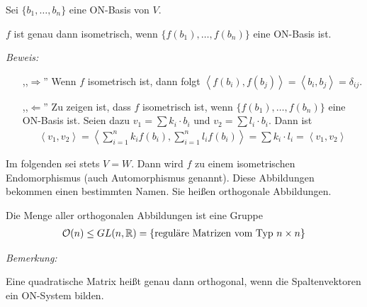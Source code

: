 
\begin{mylemma}
    Sei $\{ b_1, \ldots, b_n \}$ eine ON-Basis von $V$.

    $f$ ist genau dann isometrisch, wenn $\{ f(b_1), \ldots, f(b_n) \}$ eine ON-Basis ist.\medskip

    \textit{Beweis:}
    \begin{itemize}
        \item[,,$\Rightarrow$''] Wenn $f$ isometrisch ist, dann folgt $\left\langle f(b_i),f(b_j) \right\rangle = \left\langle b_i, b_j \right\rangle = \delta_{ij}$.
        \item[,,$\Leftarrow$''] Zu zeigen ist, dass $f$ isometrisch ist, wenn $\{ f(b_1), \ldots, f(b_n) \}$ eine ON-Basis ist.
            Seien dazu $v_1 = \sum k_i \cdot b_i$ und $v_2 = \sum l_i \cdot b_i$.
            Dann ist
            \begin{align*}
                \left\langle v_1, v_2 \right\rangle = \left\langle \sum\limits_{i = 1}^n k_i f(b_i), \sum\limits_{i = 1}^n l_i f(b_i) \right\rangle = \sum k_i \cdot l_i = \left\langle v_1, v_2 \right\rangle
            \end{align*}
    \end{itemize}
\end{mylemma}

Im folgenden sei stets $V = W$. Dann wird $f$ zu einem isometrischen Endomorphismus (auch Automorphismus genannt).
Diese Abbildungen bekommen einen bestimmten Namen. Sie heißen orthogonale Abbildungen.\medskip

Die Menge aller orthogonalen Abbildungen ist eine Gruppe
\begin{align*}
    \mathcal{O}(n) \leq GL(n,\mathbb{R}) = \{ \text{reguläre Matrizen vom Typ $n\times n$} \}
\end{align*}


\textit{Bemerkung:}\medskip

Eine quadratische Matrix heißt genau dann orthogonal, wenn die Spaltenvektoren ein ON-System bilden.


